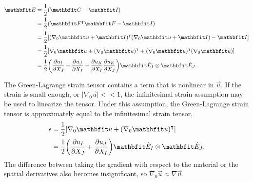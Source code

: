 \begin{align}
    \vec{E} &= \frac{1}{2} ( \vec{C} - \vec{I} ) \nonumber\\
            &= \frac{1}{2} ( \vec{F}^{\intercal} \vec{F} - \vec{I} ) \nonumber\\
            &= \frac{1}{2} \mleft[ (\nabla_{0} \vec{u} + \vec{I})^{\intercal} ( \nabla_{0} \vec{u} + \vec{I}) - \vec{I} \mright] \nonumber\\
            &= \frac{1}{2} \mleft[ \nabla_{0} \vec{u} + (\nabla_{0} \vec{u})^{\intercal} + (\nabla_{0} \vec{u})^{\intercal} (\nabla_{0} \vec{u}) \mright] \nonumber\\
            &= \frac{1}{2} \mleft( \frac{\partial u_{I}}{\partial X_{J}} + \frac{\partial u_{J}}{\partial X_{I}} + \frac{\partial u_{K}}{\partial X_{I}} \frac{\partial u_{K}}{\partial X_{J}} \mright) \Unitvec_{I} \otimes \Unitvec_{J}.
\end{align}

The Green-Lagrange strain tensor contains a term that is nonlinear in $\vec{u}$.
If the strain is small enough, or $\lvert \nabla_{0} \vec{u} \rvert << 1$, the infinitesimal strain assumption may be used to linearize the tensor.
Under this assumption, the Green-Lagrange strain tensor is approximately equal to the infinitesimal strain tensor,
\begin{align}
    \epsilon &= \frac{1}{2} \mleft[ \nabla_{0} \vec{u} + (\nabla_{0} \vec{u})^{\intercal} \mright] \nonumber\\
             &= \frac{1}{2} \mleft( \frac{\partial u_{I}}{\partial X_{J}} + \frac{\partial u_{J}}{\partial X_{I}} \mright) \Unitvec_{I} \otimes \Unitvec_{J}.
\end{align}
The difference between taking the gradient with respect to the material or the spatial derivatives also becomes insignificant, so $\nabla_{0} \vec{u} \approx \nabla \vec{u}$.

